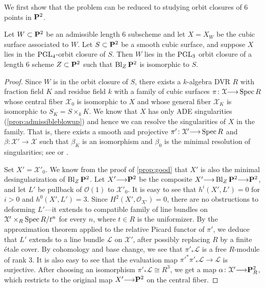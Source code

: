 \documentclass[12pt,reqno]{amsart}
\renewcommand{\k}{k}
\DeclareMathOperator{\Bl}{Bl}
\renewcommand{\to}{{\longrightarrow}}
\numberwithin{equation}{section}
\renewcommand{\O}{\mathcal O}
\begin{document}
We first show that the problem can be reduced to studying orbit closures of 6 points in $\P^2$.
\begin{proposition}\label{prop:cubictopoints}
  Let $W \subset \P^2$ be an admissible length 6 subscheme and let $X = X_W$ be the cubic surface associated to $W$.
  Let $S \subset \P^2$ be a smooth cubic surface, and suppose $X$ lies in the $\PGL_4$-orbit closure of $S$.
  Then $W$ lies in the $\PGL_3$ orbit closure of a length 6 scheme $Z \subset \P^2$ such that $\Bl_Z \P^2$ is isomorphic to $S$.
\end{proposition}
\begin{proof}
  Since $W$ is in the orbit closure of $S$, there exists a $\k$-algebra DVR $R$ with fraction field $K$ and residue field $k$ with a family of cubic surfaces $\pi \colon \mathcal X \to \spec R$ whose central fiber $\mathcal X_0$ is isomorphic to $X$ and whose general fiber $\mathcal X_K$ is isomorphic to $S_K = S \times_k K$.
  We know that $X$ has only ADE singularities (\autoref{prop:admissibleblowup}) and hence we can resolve the singularities of $X$ in the family.
  That is, there exists a smooth and projective $\pi' \colon \mathcal X' \to \spec R$ and $\beta \colon \mathcal X' \to \mathcal X$ such that $\beta_K$ is an isomorphism and $\beta_0$ is the minimal resolution of singularities; see \cite{bri:70} or \cite{tju:70}.

  Set $X' = \mathcal X'_0$.
  We know from the proof of \autoref{prop:good} that $X'$ is also the minimal desingularization of $\Bl_Z\P^2$.
  Let $X' \to \P^2$ be the composite $X' \to \Bl_Z \P^2 \to \P^2$, and let $L'$ be pullback of $\O(1)$ to $\mathcal X'_0$.
  It is easy to see that $h^i(X', L') = 0$ for $i > 0$ and $h^0(X', L') = 3$.
  Since $H^2(X', \O_{X'}) = 0$, there are no obstructions to deforming $L'$---it extends to compatible family of line bundles on $\mathcal X' \times_R \spec R/t^n$ for every $n$, where $t \in R$ is the uniformizer. 
  By the approximation theorem \cite{art:69} applied to the relative Picard functor of $\pi'$, we deduce that $L'$ extends to a line bundle $\mathcal L$ on $\mathcal X'$, after possibly replacing $R$ by a finite \'etale cover.
  By cohomology and base change, we see that $\pi'_* \mathcal L$ is a free $R$-module of rank 3.
  It is also easy to see that the evaluation map $\pi'^*\pi'_* \mathcal L \to \mathcal L$ is surjective.
  After choosing an isomorphism $\pi'_* \mathcal L \cong R^3$, we get a map $\alpha \colon \mathcal X' \to \P^2_R$, which restricts to the original map $X' \to \P^2$ on the central fiber.
  

\end{proof}
\end{document}
